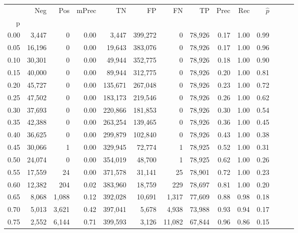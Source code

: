 \begin{tabular}{rrrrrrrrrrrrrr}
\toprule
{} &     Neg &     Pos & mPrec &       TN &       FP &      FN &      TP &  Prec &   Rec & $\hat{p}$ \\
p    &         &         &       &          &          &         &         &       &       &           \\
\midrule
0.00 &   3,447 &       0 &  0.00 &    3,447 &  399,272 &       0 &  78,926 &  0.17 &  1.00 &      0.99 \\
0.05 &  16,196 &       0 &  0.00 &   19,643 &  383,076 &       0 &  78,926 &  0.17 &  1.00 &      0.96 \\
0.10 &  30,301 &       0 &  0.00 &   49,944 &  352,775 &       0 &  78,926 &  0.18 &  1.00 &      0.90 \\
0.15 &  40,000 &       0 &  0.00 &   89,944 &  312,775 &       0 &  78,926 &  0.20 &  1.00 &      0.81 \\
0.20 &  45,727 &       0 &  0.00 &  135,671 &  267,048 &       0 &  78,926 &  0.23 &  1.00 &      0.72 \\
0.25 &  47,502 &       0 &  0.00 &  183,173 &  219,546 &       0 &  78,926 &  0.26 &  1.00 &      0.62 \\
0.30 &  37,693 &       0 &  0.00 &  220,866 &  181,853 &       0 &  78,926 &  0.30 &  1.00 &      0.54 \\
0.35 &  42,388 &       0 &  0.00 &  263,254 &  139,465 &       0 &  78,926 &  0.36 &  1.00 &      0.45 \\
0.40 &  36,625 &       0 &  0.00 &  299,879 &  102,840 &       0 &  78,926 &  0.43 &  1.00 &      0.38 \\
0.45 &  30,066 &       1 &  0.00 &  329,945 &   72,774 &       1 &  78,925 &  0.52 &  1.00 &      0.31 \\
0.50 &  24,074 &       0 &  0.00 &  354,019 &   48,700 &       1 &  78,925 &  0.62 &  1.00 &      0.26 \\
0.55 &  17,559 &      24 &  0.00 &  371,578 &   31,141 &      25 &  78,901 &  0.72 &  1.00 &      0.23 \\
0.60 &  12,382 &     204 &  0.02 &  383,960 &   18,759 &     229 &  78,697 &  0.81 &  1.00 &      0.20 \\
0.65 &   8,068 &   1,088 &  0.12 &  392,028 &   10,691 &   1,317 &  77,609 &  0.88 &  0.98 &      0.18 \\
0.70 &   5,013 &   3,621 &  0.42 &  397,041 &    5,678 &   4,938 &  73,988 &  0.93 &  0.94 &      0.17 \\
0.75 &   2,552 &   6,144 &  0.71 &  399,593 &    3,126 &  11,082 &  67,844 &  0.96 &  0.86 &      0.15 \\

\end{tabular}
